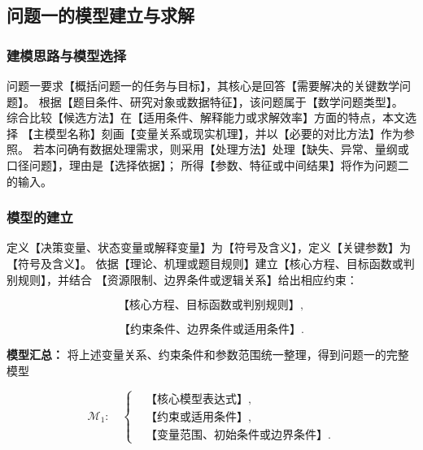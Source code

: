 
\subsection{问题一的模型建立与求解}

\subsubsection{建模思路与模型选择}

问题一要求【概括问题一的任务与目标】，其核心是回答【需要解决的关键数学问题】。
根据【题目条件、研究对象或数据特征】，该问题属于【数学问题类型】。
综合比较【候选方法】在【适用条件、解释能力或求解效率】方面的特点，本文选择
【主模型名称】刻画【变量关系或现实机理】，并以【必要的对比方法】作为参照。
若本问确有数据处理需求，则采用【处理方法】处理【缺失、异常、量纲或口径问题】，理由是【选择依据】；
所得【参数、特征或中间结果】将作为问题二的输入。

\subsubsection{模型的建立}

定义【决策变量、状态变量或解释变量】为【符号及含义】，定义【关键参数】为【符号及含义】。
依据【理论、机理或题目规则】建立【核心方程、目标函数或判别规则】，并结合
【资源限制、边界条件或逻辑关系】给出相应约束：

\begin{equation}
  \text{【核心方程、目标函数或判别规则】},
  \label{eq:q1_core}
\end{equation}

\begin{equation}
  \text{【约束条件、边界条件或适用条件】}.
  \label{eq:q1_constraint}
\end{equation}

\noindent\textbf{模型汇总：}
将上述变量关系、约束条件和参数范围统一整理，得到问题一的完整模型

\begin{equation}
  \mathcal{M}_1:\quad
  \left\{
  \begin{aligned}
    &\text{【核心模型表达式】},\\
    &\text{【约束或适用条件】},\\
    &\text{【变量范围、初始条件或边界条件】}.
  \end{aligned}
  \right.
  \label{eq:q1_summary}
\end{equation}

